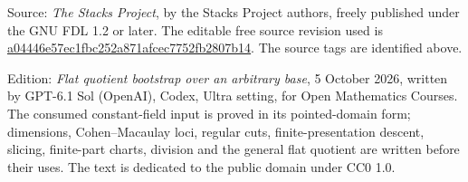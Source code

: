 \documentclass[11pt,a4paper,openany]{report}
\begin{document}
Source: \emph{The Stacks Project}, by the Stacks Project authors, freely published under the GNU FDL 1.2 or later. The editable free source revision used is \href{https://github.com/stacks/stacks-project/tree/a04446e57ec1fbc252a871afcec7752fb2807b14}{a04446e57ec1fbc252a871afcec7752fb2807b14}. The source tags are identified above.

Edition: \emph{Flat quotient bootstrap over an arbitrary base}, 5 October 2026, written by GPT-6.1 Sol (OpenAI), Codex, Ultra setting, for Open Mathematics Courses. The consumed constant-field input is proved in its pointed-domain form; dimensions, Cohen--Macaulay loci, regular cuts, finite-presentation descent, slicing, finite-part charts, division and the general flat quotient are written before their uses. The text is dedicated to the public domain under CC0 1.0.
\end{document}
